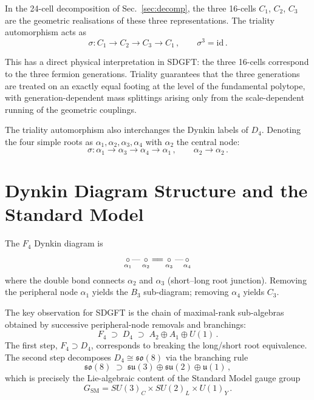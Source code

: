 \documentclass[amsmath,amssymb,aps,prd,twocolumn,superscriptaddress,nofootinbib]{revtex4-2}
\begin{document}
In the 24-cell decomposition of Sec.~\ref{sec:decomp}, the three 16-cells
$C_1$, $C_2$, $C_3$ are the geometric realisations of these three
representations.  The triality automorphism acts as
\begin{equation}\label{eq:triality_action}
  \sigma\colon C_1 \to C_2 \to C_3 \to C_1\,,
  \qquad \sigma^3 = \mathrm{id}\,.
\end{equation}

This has a direct physical interpretation in SDGFT: the three 16-cells
correspond to the three fermion generations.  Triality guarantees that the three
generations are treated on an exactly equal footing at the level of the
fundamental polytope, with generation-dependent mass splittings arising only
from the scale-dependent running of the geometric couplings.

The triality automorphism also interchanges the Dynkin labels of $D_4$.
Denoting the four simple roots as $\alpha_1,\alpha_2,\alpha_3,\alpha_4$ with
$\alpha_2$ the central node:
\begin{equation}
  \sigma\colon \alpha_1 \to \alpha_3 \to \alpha_4 \to \alpha_1\,,
  \qquad \alpha_2 \to \alpha_2\,.
\end{equation}

\section{Dynkin Diagram Structure and the Standard Model}\label{sec:dynkin}

The $F_4$ Dynkin diagram is
\begin{equation}\label{eq:F4dynkin}
  \underset{\alpha_1}{\circ}\text{---}
  \underset{\alpha_2}{\circ}\text{=\!=}
  \underset{\alpha_3}{\circ}\text{---}
  \underset{\alpha_4}{\circ}
\end{equation}
where the double bond connects $\alpha_2$ and $\alpha_3$ (short--long root
junction).  Removing the peripheral node $\alpha_1$ yields the $B_3$ sub-diagram;
removing $\alpha_4$ yields $C_3$.

The key observation for SDGFT is the chain of maximal-rank sub-algebras
obtained by successive peripheral-node removals and branchings:
\begin{equation}\label{eq:chain}
  F_4 \;\supset\; D_4 \;\supset\;
  A_2 \oplus A_1 \oplus U(1)\,.
\end{equation}
The first step, $F_4 \supset D_4$, corresponds to breaking the long/short root
equivalence.  The second step decomposes $D_4 \cong \mathfrak{so}(8)$ via the
branching rule
\begin{equation}\label{eq:branching}
  \mathfrak{so}(8) \;\supset\;
  \mathfrak{su}(3) \oplus \mathfrak{su}(2) \oplus \mathfrak{u}(1)\,,
\end{equation}
which is precisely the Lie-algebraic content of the Standard Model gauge group
\begin{equation}\label{eq:SM}
  G_{\mathrm{SM}} = SU(3)_C \times SU(2)_L \times U(1)_Y\,.
\end{equation}
\end{document}
